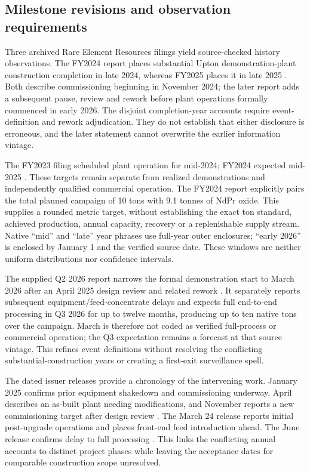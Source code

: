 \documentclass[11pt]{article}
\begin{document}
\subsection{Milestone revisions and observation requirements}
Three archived Rare Element Resources filings yield \HistoryVersions{} source-checked history observations. The FY2024 report places substantial Upton demonstration-plant construction completion in late 2024, whereas FY2025 places it in late 2025 \citep{RER2024,RER2025}. Both describe commissioning beginning in November 2024; the later report adds a subsequent pause, review and rework before plant operations formally commenced in early 2026. The disjoint completion-year accounts require event-definition and rework adjudication. They do not establish that either disclosure is erroneous, and the later statement cannot overwrite the earlier information vintage.

The FY2023 filing scheduled plant operation for mid-2024; FY2024 expected mid-2025 \citep{RER2023,RER2024}. These targets remain separate from realized demonstrations and independently qualified commercial operation. The FY2024 report explicitly pairs the total planned campaign of 10 tons with 9.1 tonnes of NdPr oxide. This supplies a rounded metric target, without establishing the exact ton standard, achieved production, annual capacity, recovery or a replenishable supply stream. Native ``mid'' and ``late'' year phrases use full-year outer enclosures; ``early 2026'' is enclosed by January 1 and the verified source date. These windows are neither uniform distributions nor confidence intervals.

The supplied Q2 2026 report narrows the formal demonstration start to March 2026 after an April 2025 design review and related rework \citep{RERQ22026}. It separately reports subsequent equipment/feed-concentrate delays and expects full end-to-end processing in Q3 2026 for up to twelve months, producing up to ten native tons over the campaign. March is therefore not coded as verified full-process or commercial operation; the Q3 expectation remains a forecast at that source vintage. This refines event definitions without resolving the conflicting substantial-construction years or creating a first-exit surveillance spell.

The dated issuer releases provide a chronology of the intervening work. January 2025 confirms prior equipment shakedown and commissioning underway, April describes an as-built plant needing modifications, and November reports a new commissioning target after design review \citep{RERUptonEarly2025,RERUptonReview2025,RERUptonLate2025}. The March 24 release reports initial post-upgrade operations and places front-end feed introduction ahead. The June release confirms delay to full processing \citep{RERUptonStart2026,RERUptonDelay2026}. This links the conflicting annual accounts to distinct project phases while leaving the acceptance dates for comparable construction scope unresolved.
\end{document}
